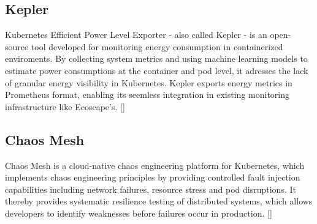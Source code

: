 \subsection{Kepler}
Kubernetes Efficient Power Level Exporter - also called Kepler - is an open-source tool developed for monitoring energy consumption in containerized enviroments.
By collecting system metrics and using machine learning models to estimate power consumptions at the container and pod level, it adresses the lack of granular energy visibility in Kubernetes.
Kepler exports energy metrics in Prometheus format, enabling its seemless integration in existing monitoring infrastructure like Ecoscape's. [\cite{kepler2024}]
\subsection{Chaos Mesh}
Chaos Mesh is a cloud-native chaos engineering platform for Kubernetes, which implements chaos engineering principles by providing controlled fault injection capabilities including network failures, resource stress and pod disruptions.
It thereby provides systematic resilience testing of distributed systems, which allows developers to identify weaknesses before failures occur in production. [\cite{chaosmesh2024}]
